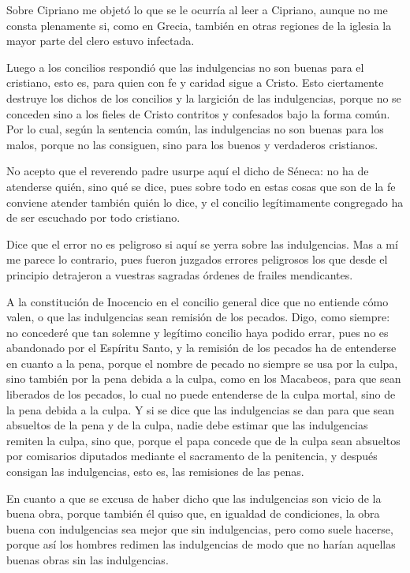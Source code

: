 Sobre Cipriano me objetó lo que se le ocurría al leer a Cipriano, aunque no me consta plenamente si, como en Grecia, también en otras regiones de la iglesia la mayor parte del clero estuvo infectada.

Luego a los concilios respondió que las indulgencias no son buenas para el cristiano, esto es, para quien con fe y caridad sigue a Cristo. Esto ciertamente destruye los dichos de los concilios y la largición de las indulgencias, porque no se conceden sino a los fieles de Cristo contritos y confesados bajo la forma común. Por lo cual, según la sentencia común, las indulgencias no son buenas para los malos, porque no las consiguen, sino para los buenos y verdaderos cristianos.

No acepto que el reverendo padre usurpe aquí el dicho de Séneca: no ha de atenderse quién, sino qué se dice, pues sobre todo en estas cosas que son de la fe conviene atender también quién lo dice, y el concilio legítimamente congregado ha de ser escuchado por todo cristiano.

Dice que el error no es peligroso si aquí se yerra sobre las indulgencias. Mas a mí me parece lo contrario, pues fueron juzgados errores peligrosos los que desde el principio detrajeron a vuestras sagradas órdenes de frailes mendicantes.

A la constitución de Inocencio en el concilio general dice que no entiende cómo valen, o que las indulgencias sean remisión de los pecados. Digo, como siempre: no concederé que tan solemne y legítimo concilio haya podido errar, pues no es abandonado por el Espíritu Santo, y la remisión de los pecados ha de entenderse en cuanto a la pena, porque el nombre de pecado no siempre se usa por la culpa, sino también por la pena debida a la culpa, como en los Macabeos, para que sean liberados de los pecados, lo cual no puede entenderse de la culpa mortal, sino de la pena debida a la culpa. Y si se dice que las indulgencias se dan para que sean absueltos de la pena y de la culpa, nadie debe estimar que las indulgencias remiten la culpa, sino que, porque el papa concede que de la culpa sean absueltos por comisarios diputados mediante el sacramento de la penitencia, y después consigan las indulgencias, esto es, las remisiones de las penas.

\marginpar{\small[351]} En cuanto a que se excusa de haber dicho que las indulgencias son vicio de la buena obra, porque también él quiso que, en igualdad de condiciones, la obra buena con indulgencias sea mejor que sin indulgencias, pero como suele hacerse, porque así los hombres redimen las indulgencias de modo que no harían aquellas buenas obras sin las indulgencias.

